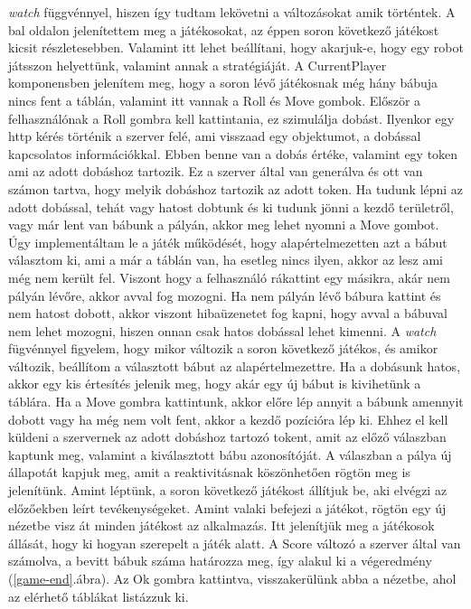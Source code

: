 \documentclass[a4paper,twoside]{article}
\begin{document}
\textit{watch} függvénnyel, hiszen így tudtam lekövetni a változásokat amik történtek. A bal oldalon jelenítettem meg a játékosokat, az éppen soron következő játékost kicsit részletesebben. Valamint itt lehet beállítani, hogy akarjuk-e, hogy egy robot játsszon helyettünk, valamint annak a stratégiáját. A CurrentPlayer komponensben jelenítem meg, hogy a soron lévő játékosnak még hány bábuja nincs fent a táblán, valamint itt vannak a Roll és Move gombok. Először a felhasználónak a Roll gombra kell kattintania, ez szimulálja dobást. Ilyenkor egy http kérés történik a szerver felé, ami visszaad egy objektumot, a dobással kapcsolatos információkkal. Ebben benne van a dobás értéke, valamint egy token ami az adott dobáshoz tartozik. Ez a szerver által van generálva és ott van számon tartva, hogy melyik dobáshoz tartozik az adott token. Ha tudunk lépni az adott dobással, tehát vagy hatost dobtunk és ki tudunk jönni a kezdő területről, vagy már lent van bábunk a pályán, akkor meg lehet nyomni a Move gombot. Úgy implementáltam le a játék működését, hogy alapértelmezetten azt a bábut választom ki, ami a már a táblán van, ha esetleg nincs ilyen, akkor az lesz ami még nem került fel. Viszont hogy a felhasználó rákattint egy másikra, akár nem pályán lévőre, akkor avval fog mozogni. Ha nem pályán lévő bábura kattint és nem hatost dobott, akkor viszont hibaüzenetet fog kapni, hogy avval a bábuval nem lehet mozogni, hiszen onnan csak hatos dobással lehet kimenni. A \textit{watch} fügvénnyel figyelem, hogy mikor változik a soron következő játékos, és amikor változik, beállítom a választott bábut az alapértelmezettre. Ha a dobásunk hatos, akkor egy kis értesítés jelenik meg, hogy akár egy új bábut is kivihetünk a táblára.  Ha a Move gombra kattintunk, akkor előre lép annyit a bábunk amennyit dobott vagy ha még nem volt fent, akkor a kezdő pozícióra lép ki. Ehhez el kell küldeni a szervernek az adott dobáshoz tartozó tokent, amit az előző válaszban kaptunk meg, valamint a kiválasztott bábu azonosítóját. A válaszban a pálya új állapotát kapjuk meg, amit a reaktivitásnak köszönhetően rögtön meg is jelenítünk. Amint léptünk, a soron következő játékost állítjuk be, aki elvégzi az előzőekben leírt tevékenységeket. Amint valaki befejezi a játékot, rögtön egy új nézetbe visz át minden játékost az alkalmazás. Itt jelenítjük meg a játékosok állását, hogy ki hogyan szerepelt a játék alatt. A Score változó a szerver által van számolva, a bevitt bábuk száma határozza meg, így alakul ki a végeredmény (\ref{game-end}.ábra). Az Ok gombra kattintva, visszakerülünk abba a nézetbe, ahol az elérhető táblákat listázzuk ki. 
\end{document}
